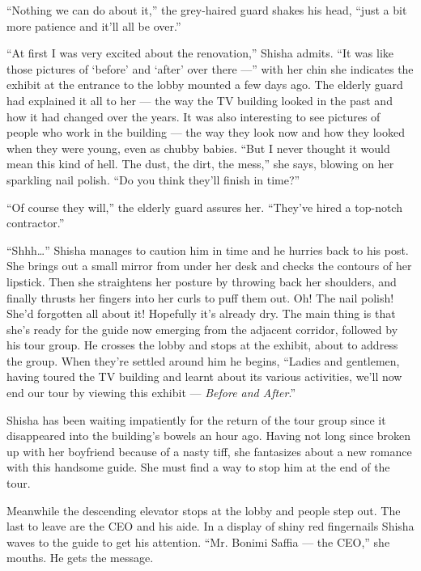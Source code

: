 \documentclass[twoside,11pt,openany]{book}
\begin{document}
``Nothing we can do about it,'' the grey-haired guard shakes his head, ``just a
bit more patience and it'll all be over.''

``At first I was very excited about the renovation,'' Shisha admits. ``It was
like those pictures of `before' and `after' over there ---'' with her chin she indicates the exhibit at the
entrance to the lobby mounted a few days ago. The elderly guard had explained it all to her --- the way the TV building
looked in the past and how it had changed over the years. It was also interesting to see pictures of people who work in
the building --- the way they look now and how they looked when they were young, even as chubby babies.
``But I never thought it would mean this kind of hell. The dust, the dirt, the mess,'' she
says, blowing on her sparkling nail polish. ``Do you think they'll finish in time?''

``Of course they will,'' the elderly guard assures her. ``They've hired a
top-notch contractor.''

``Shhh{\ldots}'' Shisha manages to caution him in time and he hurries back to his post. She
brings out a small mirror from under her desk and checks the contours of her lipstick. Then she straightens her posture
by{ }throwing back her shoulders, and finally thrusts her fingers into her curls to puff them out. Oh!
The nail polish! She'd forgotten all about it! Hopefully it's already dry. The main thing is that she's ready for the
guide now emerging from the adjacent corridor, followed by his tour group. He crosses the lobby and stops at the
exhibit, about to address the group. When they're settled around him he begins, ``Ladies and gentlemen,
having toured the TV building and learnt about its various activities, we'll now end our tour by viewing this exhibit --- \textit{Before and After}.''

Shisha has been waiting impatiently for the return of the tour group since it disappeared into the building's bowels an
hour ago. Having not long since broken up with her boyfriend because of a nasty tiff, she fantasizes about a new
romance with this handsome guide. She must find a way to stop him at the end of the tour.

Meanwhile the descending elevator stops at the lobby and people step out. The last to leave are the CEO and his aide. In
a display of shiny red fingernails Shisha waves to the guide to get his attention. ``Mr.  Bonimi Saffia ---
the CEO,'' she mouths. He gets the message.
\end{document}

